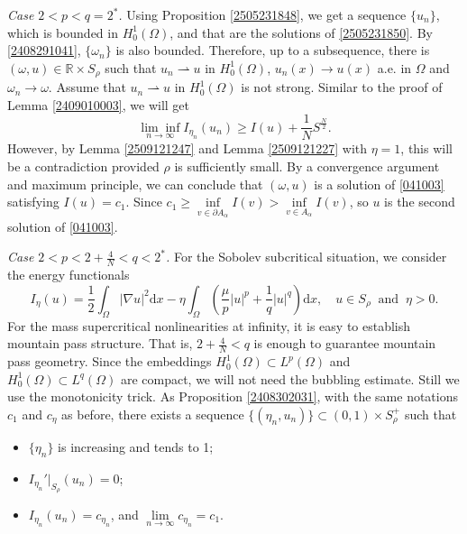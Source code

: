 \documentclass[10pt]{article}
\numberwithin{equation}{section}
\newcommand{\ud}{\mathrm{d}}
\numberwithin{equation}{section}
\begin{document}
{\it Case $2<p<q=2^*$. } Using Proposition \ref{2505231848}, we get a sequence $\{u_n\}$, which is bounded in $H_0^1(\Omega)$, and that are the solutions of \eqref{2505231850}. By \eqref{2408291041}, $\{\omega_n\}$ is also bounded. Therefore, up to a subsequence, there is $(\omega, u)\in  \mathbb{R}\times S_\rho $ such that $u_n\rightharpoonup u$ in $H_0^1(\Omega)$, $u_n(x)\to u(x)$ a.e. in $\Omega$ and $\omega_n\to \omega$.
Assume that ${u}_n\rightharpoonup u$ in $H^1_0(\Omega)$ is not strong. Similar to the proof of Lemma \ref{2409010003}, we will get
\[
\underset{n\to\infty}{\lim\inf}I_{\eta_n}(u_n)\ge I(u)+\frac{1}{N}S^{\frac{N}{2}}.
\]
However, by Lemma \ref{2509121247} and Lemma \ref{2509121227} with $\eta=1$, this will be a contradiction provided $\rho$ is sufficiently small.
By a convergence argument and maximum principle, we can conclude that $(\omega, u)$ is a solution of \eqref{041003} satisfying $I(u)=c_1$. Since $c_1\ge \underset{v\in \partial A_\alpha}{\inf}I(v)>\underset{v\in A_\alpha}{\inf}I(v)$, so $u$ is the second solution of \eqref{041003}.

\medskip
{\it Case $2<p<2+\frac{4}{N}<q<2^*$.} For the Sobolev subcritical situation, we consider the energy functionals
\[
I_{\eta}(u)=\frac{1}{2}\int_{\Omega}|\nabla u|^2 \ud x
-\eta\int_{\Omega}\left(\frac{\mu}{p} |u|^p+\frac1{q}|u|^{q}\right)  \ud x,\quad u\in S_\rho\;\;\mbox{and}\;\; \eta>0.
\] 
For the mass supercritical nonlinearities at infinity, it is easy to establish mountain pass structure. That is, $2+\frac{4}{N}< q$ is enough to guarantee mountain pass geometry. Since the embeddings $H_0^1(\Omega)\subset L^p(\Omega)$ and $H_0^1(\Omega)\subset L^q(\Omega)$ are compact, we will not need the bubbling estimate. Still we use the monotonicity trick. As Proposition \ref{2408302031}, with the same notations $c_1$ and $c_\eta$ as before,  there exists a sequence $\{(\eta_n, u_n)\}\subset (0, 1)\times S_\rho^+$ such that
\begin{itemize}
\item[\rm (i)] $\{\eta_n\}$ is increasing and tends to 1;
\item[\rm (ii)] $I_{\eta_n}'|_{S_\rho}(u_n)=0$;
\item[\rm (iii)] $I_{\eta_n}(u_n)=c_{\eta_n}$, and $\lim\limits_{n\to\infty}{c}_{\eta_n}=c_{1}$.
\end{itemize}
\end{document}
